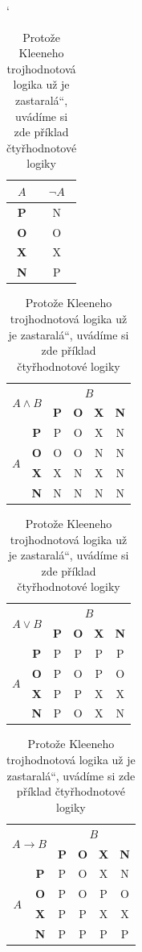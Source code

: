 \documentclass[a4paper,11pt,titlepage]{article}
\newcommand{\myuv}[1]{\quotedblbase #1\textquotedblleft}
\begin{document}
\begin{table}[h]
\begin{center}
\catcode`
    \begin{tabular}{|c|c|} \hline
        $A$ & $\neg A$\\ \hline
        \textbf{P} & N\\ \hline
        \textbf{O} & O\\ \hline
        \textbf{X} & X\\ \hline
        \textbf{N} & P\\ \hline
    \end{tabular} 
    \begin{tabular}{|c|c|c|c|c|c|} \hline
        \multicolumn{2}{|c|}{\multirow{2}{*}{$A \wedge B$}} & \multicolumn{4}{|c|}{$B$}\\ \cline{3-6}
        \multicolumn{2}{|c|}{} & \textbf{P} & \textbf{O} & \textbf{X} & \textbf{N}\\ \hline
        & \textbf{P} & P & O & X & N\\ \cline{2-6}
        \multirow{2}{*}{$A$} & \textbf{O} & O & O & N & N\\ \cline{2-6}
        & \textbf{X} & X & N & X & N\\ \cline{2-6}
        & \textbf{N} & N & N & N & N\\ \hline
    \end{tabular}
    \begin{tabular}{|c|c|c|c|c|c|} \hline
        \multicolumn{2}{|c|}{\multirow{2}{*}{$A \vee B$}} & \multicolumn{4}{|c|}{$B$}\\ \cline{3-6}
        \multicolumn{2}{|c|}{} & \textbf{P} & \textbf{O} & \textbf{X} & \textbf{N}\\ \hline
        & \textbf{P} & P & P & P & P\\ \cline{2-6}
        \multirow{2}{*}{$A$} & \textbf{O} & P & O & P & O\\ \cline{2-6}
        & \textbf{X} & P & P & X & X\\ \cline{2-6}
        & \textbf{N} & P & O & X & N\\ \hline
    \end{tabular}
      \begin{tabular}{|c|c|c|c|c|c|} \hline
        \multicolumn{2}{|c|}{\multirow{2}{*}{$A \rightarrow B$}} & \multicolumn{4}{|c|}{$B$}\\ \cline{3-6}
        \multicolumn{2}{|c|}{} & \textbf{P} & \textbf{O} & \textbf{X} & \textbf{N}\\ \hline
        & \textbf{P} & P & O & X & N\\ \cline{2-6}
        \multirow{2}{*}{$A$} & \textbf{O} & P & O & P & O\\ \cline{2-6}
        & \textbf{X} & P & P & X & X\\ \cline{2-6}
        & \textbf{N} & P & P & P & P\\ \hline
    \end{tabular}
\caption{Protože Kleeneho trojhodnotová logika už je \myuv{zastaralá}, uvádíme si zde příklad čtyřhodnotové
logiky}
\label{Kleene}
\end{center}
\end{table}
\pagebreak
\newpage
\end{document}
